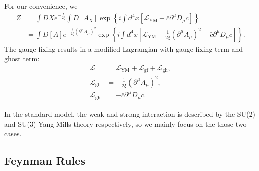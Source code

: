 For our convenience, we 
\begin{equation}
\begin{aligned}
	Z &= \int DX e^{-\frac{X}{2 \xi}}\int D[A_X] \exp\left\{i\int d^4x \left[\mathcal{L}_{\mathrm{YM}} - \bar c\partial^\mu D_\mu c \right]\right\} \\
	&= \int D[A] e^{-\frac{i}{2\xi}(\partial^\mu A_\mu)^2} \exp\left\{i\int d^4x \left[\mathcal{L}_{\mathrm{YM}} -\frac{1}{2\xi}(\partial^\mu A_\mu)^2 - \bar c\partial^\mu D_\mu c \right]\right\}.
\end{aligned}
\end{equation}
The gauge-fixing results in a modified Lagrangian with gauge-fixing term and ghost term:
\begin{equation}
\begin{aligned}
	\mathcal L &= \mathcal{L}_{\mathrm{YM}} + \mathcal{L}_{\mathrm{gf}} + \mathcal{L}_{\mathrm{gh}}, \\
	\mathcal{L}_{\mathrm{gf}} &= -\frac{1}{2\xi}(\partial^\mu A_\mu)^2, \\
	\mathcal{L}_{\mathrm{gh}} &= -\bar c\partial^\mu D_\mu c.
\end{aligned}
\end{equation}

In the standard model, the weak and strong interaction is described by the SU(2) and SU(3) Yang-Mills theory respectively, so we mainly focus on the those two cases.


\subsection{Feynman Rules}

